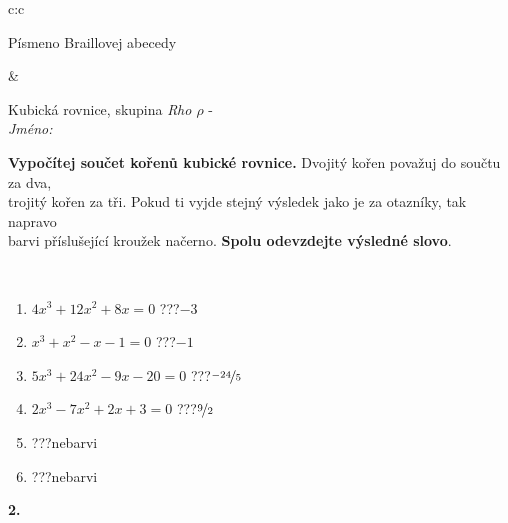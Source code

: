 \documentclass[10pt]{report}
\begin{document}
\begin{tabular}{c:c}
\begin{minipage}[c][104.5mm][t]{0.5\linewidth}
\begin{center}
\begin{minipage}{0.20\linewidth}
\begin{center}
{\small Písmeno Braillovej abecedy}
\end{center}
\end{minipage}
\end{center}
\end{minipage}
&
\begin{minipage}[c][104.5mm][t]{0.5\linewidth}
\begin{center}
\vspace{7mm}
{\huge Kubická rovnice, skupina \textit{Rho $\rho$} -}\\[5mm]
\textit{Jméno:}\phantom{xxxxxxxxxxxxxxxxxxxxxxxxxxxxxxxxxxxxxxxxxxxxxxxxxxxxxxxxxxxxxxxxx}\\[5mm]
\begin{minipage}{0.95\linewidth}
\begin{center}
\textbf{Vypočítej součet kořenů kubické rovnice.} Dvojitý kořen považuj do součtu za dva,\\trojitý kořen za tři. Pokud ti vyjde stejný výsledek jako je za otazníky, tak napravo\\barvi příslušející kroužek načerno. \textbf{Spolu odevzdejte výsledné slovo}.
\end{center}
\end{minipage}
\\[1mm]
\begin{minipage}{0.79\linewidth}
\begin{center}
\begin{varwidth}{\linewidth}
\begin{enumerate}
\Large
\item $4x^3+12x^2+8x=0$\quad \dotfill\; ???\;\dotfill \quad $-3$
\item $x^3+x^2-x-1=0$\quad \dotfill\; ???\;\dotfill \quad $-1$
\item $5x^3+24x^2-9x-20=0$\quad \dotfill\; ???\;\dotfill \quad $\nicefrac{-24}{5}$
\item $2x^3-7x^2+2x+3=0$\quad \dotfill\; ???\;\dotfill \quad $\nicefrac{9}{2}$
\item \quad \dotfill\; ???\;\dotfill \quad nebarvi
\item \quad \dotfill\; ???\;\dotfill \quad nebarvi
\end{enumerate}
\end{varwidth}
\end{center}
\end{minipage}
\begin{minipage}{0.20\linewidth}
\begin{center}
{\Huge\bfseries 2.} \\[2mm]

\end{center}
\end{minipage}
\end{center}
\end{minipage}
\end{tabular}
\end{document}

